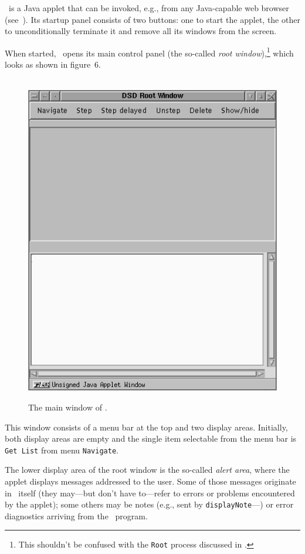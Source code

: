 \dsd\ is a Java applet that can be invoked, e.g., from any Java-capable
web browser (see~).
Its startup panel consists of two buttons: one to start the applet, the
other to unconditionally terminate it and remove all its windows
from the screen.

When started, \dsd\ opens its main control panel (the so-called
{\em root window\/}),\footnote{This shouldn't be confused with the
{\tt Root} process discussed in .}
which looks as shown in
figure~6.

\begin{figure}
\begin{center}
\ \includegraphics[scale=0.5]{FIGURES/dsdmain.png}
\caption{The main window of \dsd.}%
\end{center}
\end{figure}

This window consists of a menu bar at the top and two display areas.
Initially, both display areas are empty and the single item selectable
from the menu bar is {\tt Get~List} from menu {\tt Navigate}.

The lower display area of the root window is the so-called
{\em alert area}, where the applet displays messages addressed to the user.
Some of those messages originate in \dsd\ itself (they may---but don't
have to---refer to errors or problems encountered by the applet);
some others may be
notes (e.g., sent by {\tt displayNote}---) or error
diagnostics arriving from the \smurph\ program.

